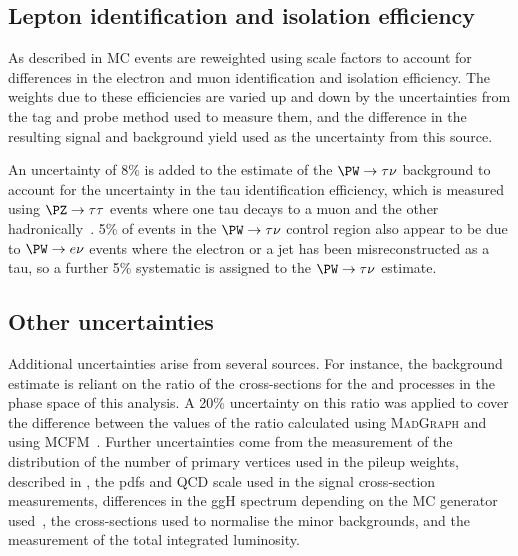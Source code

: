 \subsection{Lepton identification and isolation efficiency}
\label{sec:promptlepweights}
As described in  \ac{MC} events are reweighted using scale factors to account for differences in the electron and muon identification and isolation efficiency. The weights due to these efficiencies are varied up and down by the uncertainties from the tag and probe method used to measure them, and the difference in the resulting signal and background yield used as the uncertainty from this source.

An uncertainty of 8\% is added to the estimate of the $\PW\rightarrow\tau\nu$ background to account for the uncertainty in the tau identification efficiency, which is measured using $\PZ\rightarrow\tau\tau$ events where one tau decays to a muon and the other hadronically~\cite{Chatrchyan:1385560}. 5\% of events in the $\PW\rightarrow\tau\nu$ control region also appear to be due to $\PW\rightarrow e\nu$ events where the electron or a jet has been misreconstructed as a tau, so a further 5\% systematic is assigned to the $\PW\rightarrow\tau\nu$ estimate.


\subsection{Other uncertainties}
\label{sec:promptzextrap}
Additional uncertainties arise from several sources. For instance, the \Znunu background estimate is reliant on the ratio of the cross-sections for the \Znunu and \Zmumu processes in the phase space of this analysis. A 20\% uncertainty on this ratio was applied to cover the difference between the values of the ratio calculated using \textsc{MadGraph} and using \textsc{MCFM}~\cite{ARTICLE:CMSAN-12-403}. Further uncertainties come from the measurement of the distribution of the number of primary vertices used in the pileup weights, described in , the \ac{pdf}s and \ac{QCD} scale used in the signal cross-section measurements, differences in the \ac{ggH} \dphijj spectrum depending on the \ac{MC} generator used~\cite{ARTICLE:CMSAN-12-403}, the cross-sections used to normalise the minor backgrounds, and the measurement of the total integrated luminosity.


